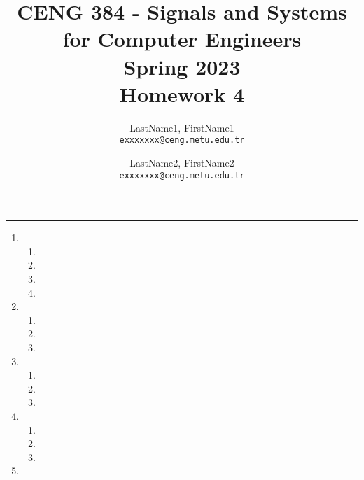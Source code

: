 \documentclass[10pt,a4paper, margin=1in]{article}
\author{
  LastName1, FirstName1\\
  \texttt{exxxxxxx@ceng.metu.edu.tr}
  \and
  LastName2, FirstName2\\
  \texttt{exxxxxxx@ceng.metu.edu.tr}
}
\title{CENG 384 - Signals and Systems for Computer Engineers \\
Spring 2023 \\
Homework 4}
\begin{document}
\maketitle



\noindent\rule{19cm}{1.2pt}

\begin{enumerate}

\item %
	\begin{enumerate}   
    \item %
    \item %
	\item %
    \item %
    \end{enumerate}

\item %
	\begin{enumerate}
    \item %
    \item %
	\item %
    \end{enumerate}

\item %
	\begin{enumerate}
    \item %
    \item %
	\item %
    \end{enumerate}

\item %
    \begin{enumerate}   
    \item %
    \item %
	\item %
    \end{enumerate}

\item %
        

\end{enumerate}
\end{document}
